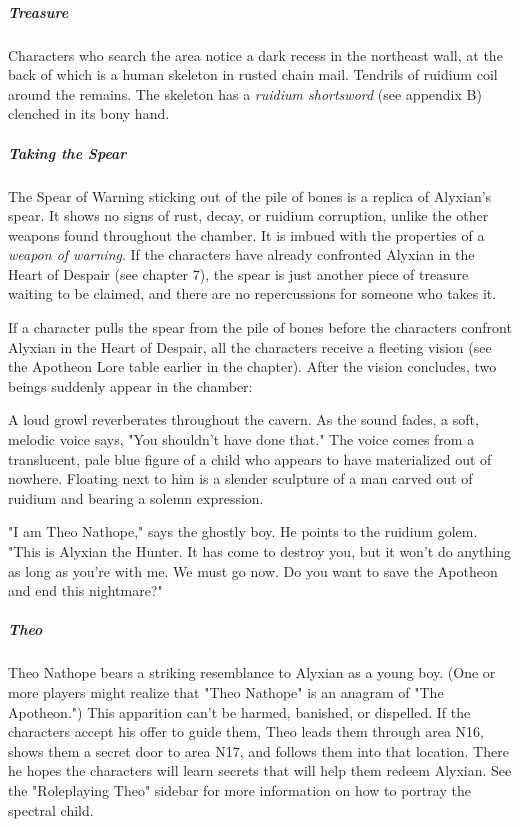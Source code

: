 \documentclass[10pt,a4paper,twoside,fancy,bg=print,twocolumn,openany,nodeprecatedcode]{dndbook}
\begin{document}
\subparagraph{Treasure}
Characters who search the area notice a dark recess in the northeast wall, at the back of which is a human skeleton in rusted chain mail. Tendrils of ruidium coil around the remains. The skeleton has a \textit{ruidium shortsword} (see appendix B) clenched in its bony hand.

\subparagraph{Taking the Spear}
The Spear of Warning sticking out of the pile of bones is a replica of Alyxian's spear. It shows no signs of rust, decay, or ruidium corruption, unlike the other weapons found throughout the chamber. It is imbued with the properties of a \textit{weapon of warning}. If the characters have already confronted Alyxian in the Heart of Despair (see chapter 7), the spear is just another piece of treasure waiting to be claimed, and there are no repercussions for someone who takes it.

If a character pulls the spear from the pile of bones before the characters confront Alyxian in the Heart of Despair, all the characters receive a fleeting vision (see the Apotheon Lore table earlier in the chapter). After the vision concludes, two beings suddenly appear in the chamber:

\begin{DndReadAloud}{}
A loud growl reverberates throughout the cavern. As the sound fades, a soft, melodic voice says, "You shouldn't have done that." The voice comes from a translucent, pale blue figure of a child who appears to have materialized out of nowhere. Floating next to him is a slender sculpture of a man carved out of ruidium and bearing a solemn expression.

"I am Theo Nathope," says the ghostly boy. He points to the ruidium golem. "This is Alyxian the Hunter. It has come to destroy you, but it won't do anything as long as you're with me. We must go now. Do you want to save the Apotheon and end this nightmare?"

\end{DndReadAloud}

\subparagraph{Theo}
Theo Nathope bears a striking resemblance to Alyxian as a young boy. (One or more players might realize that "Theo Nathope" is an anagram of "The Apotheon.") This apparition can't be harmed, banished, or dispelled. If the characters accept his offer to guide them, Theo leads them through area N16, shows them a secret door to area N17, and follows them into that location. There he hopes the characters will learn secrets that will help them redeem Alyxian. See the "Roleplaying Theo" sidebar for more information on how to portray the spectral child.
\end{document}

